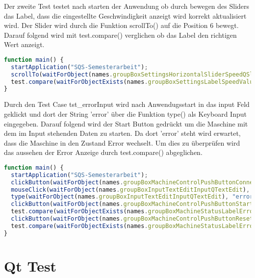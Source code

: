 		Der zweite Test testet nach starten der Anwendung ob durch bewegen des Sliders das Label, dass die eingestellte Geschwindigkeit anzeigt wird korrekt aktualisiert wird. Der Slider wird durch die Funktion scrollTo() auf die Position 6 bewegt. Darauf folgend wird mit test.compare() verglichen ob das Label den richtigen Wert anzeigt.
		
		\begin{lstlisting}[language=JavaScript, caption=tst\_slider]
function main() {
  startApplication("SQS-Semesterarbeit");
  scrollTo(waitForObject(names.groupBoxSettingsHorizontalSliderSpeedQSlider), 6);
  test.compare(waitForObjectExists(names.groupBoxSettingsLabelSpeedValueQLabel).text, "6");
}

		\end{lstlisting}
		
		Durch den Test Case tst\_errorInput wird nach Anwendugsstart in das input Feld geklickt und dort der String 'error' über die Funktion type() als Keyboard Input eingegeben. Darauf folgend wird der Start Button gedrückt um die Maschine mit dem im Input stehenden Daten zu starten. Da dort 'error' steht wird erwartet, dass die Maschine in den Zustand Error wechselt. Um dies zu überprüfen wird das aussehen der Error Anzeige durch test.compare() abgeglichen.
		
		\begin{lstlisting}[language=JavaScript, caption=tst\_errorInput]
function main() {
  startApplication("SQS-Semesterarbeit");
  clickButton(waitForObject(names.groupBoxMachineControlPushButtonConnectQPushButton));
  mouseClick(waitForObject(names.groupBoxInputTextEditInputQTextEdit), 234, 156, Qt.NoModifier, Qt.LeftButton);
  type(waitForObject(names.groupBoxInputTextEditInputQTextEdit), "error");
  clickButton(waitForObject(names.groupBoxMachineControlPushButtonStartQPushButton));
  test.compare(waitForObjectExists(names.groupBoxMachineStatusLabelErrorStatusQLabel).styleSheet, "border-radius: 6px; background-color: rgb(203, 47, 47)");
  clickButton(waitForObject(names.groupBoxMachineControlPushButtonResetErrorAndEStopQPushButton));
  test.compare(waitForObjectExists(names.groupBoxMachineStatusLabelErrorStatusQLabel).styleSheet, "border-radius: 6px; background-color: rgb(27, 193, 00)");
}
\end{lstlisting}
		
\chapter{Qt Test}
		
